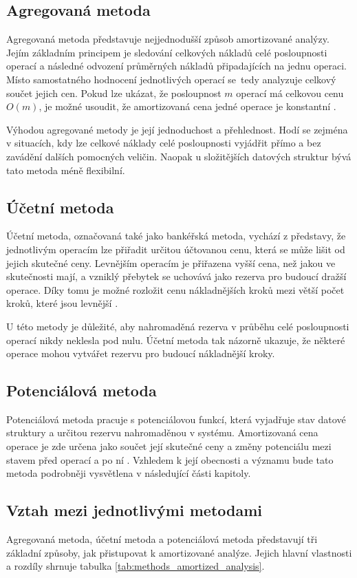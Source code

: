 \subsection{Agregovaná metoda}
Agregovaná metoda představuje nejjednodušší způsob amortizované analýzy. Jejím základním principem je sledování celkových nákladů celé posloupnosti operací a následné odvození průměrných nákladů připadajících na jednu operaci. Místo samostatného hodnocení jednotlivých operací se~tedy analyzuje celkový součet jejich cen. Pokud lze ukázat, že posloupnost \(m\) operací má celkovou cenu \(O(m)\), je možné usoudit, že amortizovaná cena jedné operace je konstantní \cite{cmu_amortized}.

Výhodou agregované metody je její jednoduchost a přehlednost. Hodí se zejména v situacích, kdy lze celkové náklady celé posloupnosti vyjádřit přímo a bez zavádění dalších pomocných veličin. Naopak u složitějších datových struktur bývá tato metoda méně flexibilní.

\subsection{Účetní metoda}
Účetní metoda, označovaná také jako bankéřská metoda, vychází z představy, že jednotlivým operacím lze přiřadit určitou účtovanou cenu, která se může lišit od jejich skutečné ceny. Levnějším operacím je přiřazena vyšší cena, než jakou ve skutečnosti mají, a vzniklý přebytek se uchovává jako rezerva pro budoucí dražší operace. Díky tomu je možné rozložit cenu nákladnějších kroků mezi větší počet kroků, které jsou levnější \cite{cmu_amortized}.

U této metody je důležité, aby nahromaděná rezerva v průběhu celé posloupnosti operací nikdy neklesla pod nulu. Účetní metoda tak názorně ukazuje, že některé operace mohou vytvářet rezervu pro budoucí nákladnější kroky.

\subsection{Potenciálová metoda}
Potenciálová metoda pracuje s potenciálovou funkcí, která vyjadřuje stav datové struktury a určitou rezervu nahromaděnou v systému. Amortizovaná cena operace je zde určena jako součet její skutečné ceny a změny potenciálu mezi stavem před operací a po ní \cite{cmu_amortized}. Vzhledem k její obecnosti a významu bude tato metoda podrobněji vysvětlena v následující části kapitoly.

\subsection{Vztah mezi jednotlivými metodami}
Agregovaná metoda, účetní metoda a potenciálová metoda představují tři základní způsoby, jak přistupovat k amortizované analýze. Jejich hlavní vlastnosti a rozdíly shrnuje tabulka \ref{tab:methods_amortized_analysis}.

